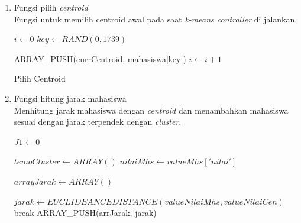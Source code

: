 \begin{enumerate}
    \item Fungsi pilih \textit{centroid} \\
        Fungsi untuk memilih centroid awal pada saat \textit{k-means controller} di jalankan.\\
        
        \begin{algorithm}[H]
            \begin{algorithmic}[1]
                    \State $i \gets 0$
                        \State $key \gets RAND(0,1739)$ 
                        
                                \State ARRAY\_PUSH(currCentroid, mahasiswa[key])
                                \State $i \gets i+1$
                            \EndIf
                        \EndIf
                    \EndWhile
                \EndProcedure
            \end{algorithmic} 
            \caption{Pilih Centroid}
            \label{alg:pilih centroid}
        \end{algorithm}
    
    \item Fungsi hitung jarak mahasiswa \\
        Menhitung jarak mahasiswa dengan \textit{centroid} dan menambahkan mahasiswa sesuai dengan jarak terpendek dengan \textit{cluster}.\\
        
        \begin{algorithm}[H]
            \begin{algorithmic}[1]
                    \State $J1 \gets 0$
                    
                        \State $temoCluster \gets ARRAY()$ 
                        \State $nilaiMhs \gets valueMhs['nilai']$
                        
                            \State $arrayJarak \gets ARRAY()$
                            
                                    \State $jarak \gets EUCLIDEANCEDISTANCE(valueNilaiMhs, valueNilaiCen)$
                                    \State break
                                \EndIf
                            \EndFor
                            \State ARRAY\_PUSH(arrJarak, jarak)
                        \EndFor
                        

\end{algorithmic}
\end{algorithm}
\end{enumerate}
